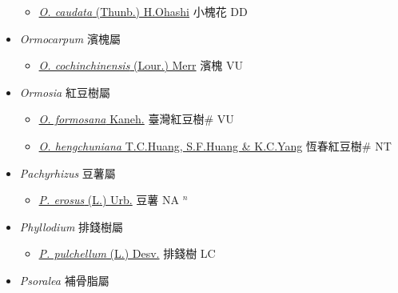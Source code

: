 \begin{itemize}
  \begin{itemize}
        \item[] \href{http://www.theplantlist.org/tpl1.1/search?q=Ohwia+caudata}{\textit{O. caudata} (Thunb.) H.Ohashi}     小槐花 DD
  \end{itemize}
 \item[] \textit{Ormocarpum} 濱槐屬
                    
  \begin{itemize}
        \item[] \href{http://www.theplantlist.org/tpl1.1/search?q=Ormocarpum+cochinchinensis}{\textit{O. cochinchinensis} (Lour.) Merr}   濱槐 VU
  \end{itemize}
 \item[] \textit{Ormosia} 紅豆樹屬
                    
  \begin{itemize}
        \item[] \href{http://www.theplantlist.org/tpl1.1/search?q=Ormosia+formosana}{\textit{O. formosana} Kaneh.}   臺灣紅豆樹\# VU
        \item[] \href{http://www.theplantlist.org/tpl1.1/search?q=Ormosia+hengchuniana}{\textit{O. hengchuniana} T.C.Huang, S.F.Huang \& K.C.Yang}   恆春紅豆樹\# NT
  \end{itemize}
 \item[] \textit{Pachyrhizus} 豆薯屬
                    
  \begin{itemize}
        \item[] \href{http://www.theplantlist.org/tpl1.1/search?q=Pachyrhizus+erosus}{\textit{P. erosus} (L.) Urb.}   豆薯 NA $^n$
  \end{itemize}
 \item[] \textit{Phyllodium} 排錢樹屬
                    
  \begin{itemize}
        \item[] \href{http://www.theplantlist.org/tpl1.1/search?q=Phyllodium+pulchellum}{\textit{P. pulchellum} (L.) Desv.}   排錢樹 LC
  \end{itemize}
 \item[] \textit{Psoralea} 補骨脂屬
                    

\end{itemize}

